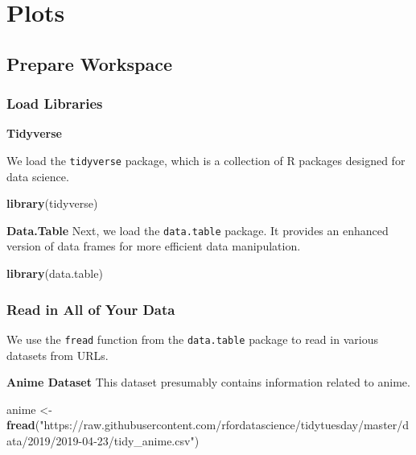 \documentclass[
]{book}
\newenvironment{Shaded}{\begin{snugshade}}{\end{snugshade}}
\newcommand{\FunctionTok}[1]{\textcolor[rgb]{0.13,0.29,0.53}{\textbf{#1}}}
\newcommand{\NormalTok}[1]{#1}
\newcommand{\OtherTok}[1]{\textcolor[rgb]{0.56,0.35,0.01}{#1}}
\newcommand{\StringTok}[1]{\textcolor[rgb]{0.31,0.60,0.02}{#1}}
\begin{document}
\section{Plots}\label{plots}

\subsection*{Prepare Workspace}\label{prepare-workspace}

\subsubsection*{Load Libraries}\label{load-libraries}

\textbf{Tidyverse}

We load the \texttt{tidyverse} package, which is a collection of R packages designed for data science.

\begin{Shaded}
\begin{Highlighting}[]
\FunctionTok{library}\NormalTok{(tidyverse)}
\end{Highlighting}
\end{Shaded}

\textbf{Data.Table}
Next, we load the \texttt{data.table} package. It provides an enhanced version of data frames for more efficient data manipulation.

\begin{Shaded}
\begin{Highlighting}[]
\FunctionTok{library}\NormalTok{(data.table)}
\end{Highlighting}
\end{Shaded}

\subsubsection*{Read in All of Your Data}\label{read-in-all-of-your-data}

We use the \texttt{fread} function from the \texttt{data.table} package to read in various datasets from URLs.

\textbf{Anime Dataset}
This dataset presumably contains information related to anime.

\begin{Shaded}
\begin{Highlighting}[]
\NormalTok{anime }\OtherTok{\textless{}{-}} \FunctionTok{fread}\NormalTok{(}\StringTok{"https://raw.githubusercontent.com/rfordatascience/tidytuesday/master/data/2019/2019{-}04{-}23/tidy\_anime.csv"}\NormalTok{)}
\end{Highlighting}
\end{Shaded}
\end{document}
